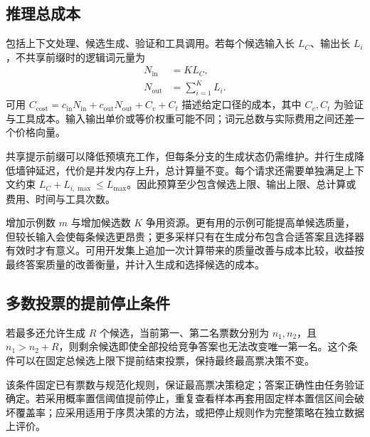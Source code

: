 \documentclass[../textbook.tex]{subfiles}
\begin{document}
\subsection{推理总成本}
包括上下文处理、候选生成、验证和工具调用。若每个候选输入长 $L_C$、输出长 $L_i$，不共享前缀时的逻辑词元量为
\begin{equation}
 \begin{aligned}
  N_{\mathrm{in}} &= KL_C, \\
  N_{\mathrm{out}} &= \sum_{i=1}^{K}L_i.
 \end{aligned}
\end{equation}
可用 $C_{\mathrm{cost}}=c_{\mathrm{in}}N_{\mathrm{in}}+c_{\mathrm{out}}N_{\mathrm{out}}+C_v+C_t$ 描述给定口径的成本，其中 $C_v,C_t$ 为验证与工具成本。输入输出单价或等价权重可能不同；词元总数与实际费用之间还差一个价格向量。

共享提示前缀可以降低预填充工作，但每条分支的生成状态仍需维护。并行生成降低墙钟延迟，代价是并发内存上升，总计算量不变。每个请求还需要单独满足上下文约束 $L_C+L_{i,\max}\le L_{\max}$。因此预算至少包含候选上限、输出上限、总计算或费用、时间与工具次数。

增加示例数 $m$ 与增加候选数 $K$ 争用资源。更有用的示例可能提高单候选质量，但较长输入会使每条候选更昂贵；更多采样只有在生成分布包含合适答案且选择器有效时才有意义。可用开发集上追加一次计算带来的质量改善与成本比较，收益按最终答案质量的改善衡量，并计入生成和选择候选的成本。

\subsection{多数投票的提前停止条件}
若最多还允许生成 $R$ 个候选，当前第一、第二名票数分别为 $n_1,n_2$，且 $n_1>n_2+R$，则剩余候选即使全部投给竞争答案也无法改变唯一第一名。这个条件可以在固定总候选上限下提前结束投票，保持最终最高票决策不变。

该条件固定已有票数与规范化规则，保证最高票决策稳定；答案正确性由任务验证确定。若采用概率置信阈值提前停止，重复查看样本再套用固定样本置信区间会破坏覆盖率；应采用适用于序贯决策的方法，或把停止规则作为完整策略在独立数据上评价。
\end{document}
